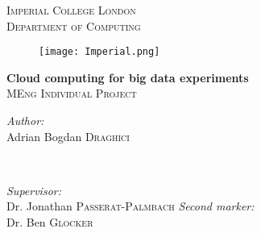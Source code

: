 \newcommand{\HRule}{\rule{\linewidth}{0.5mm}} %
\clearpage
\thispagestyle{empty}

\begin{center} %
 

\vspace{5cm}
\textsc{\LARGE Imperial College London}\\[0.5cm] %
\textsc{\Large Department of Computing}\\[1.5cm] %

\begin{figure}[H]
	\centering
		\texttt{[image: Imperial.png]}
\end{figure}



\vspace{0.4cm}
{ \vspace{0.3cm}\huge \bfseries Cloud computing for big data experiments } \\[0.4cm]
\textsc{\large MEng Individual Project}\\[1.5cm] %
 


\begin{minipage}{0.4\textwidth}
\begin{flushleft} \large
\emph{Author:}\\
Adrian Bogdan \textsc{Draghici} \\ \vspace{0.63cm}
\end{flushleft}
\end{minipage}
~
\begin{minipage}{0.5\textwidth}
\begin{flushright} \large
\emph{Supervisor:} \\
Dr. Jonathan \textsc{Passerat-Palmbach}
\emph{Second marker:} \\
Dr. Ben \textsc{Glocker} 
\end{flushright}


\end{minipage}
\end{center}
